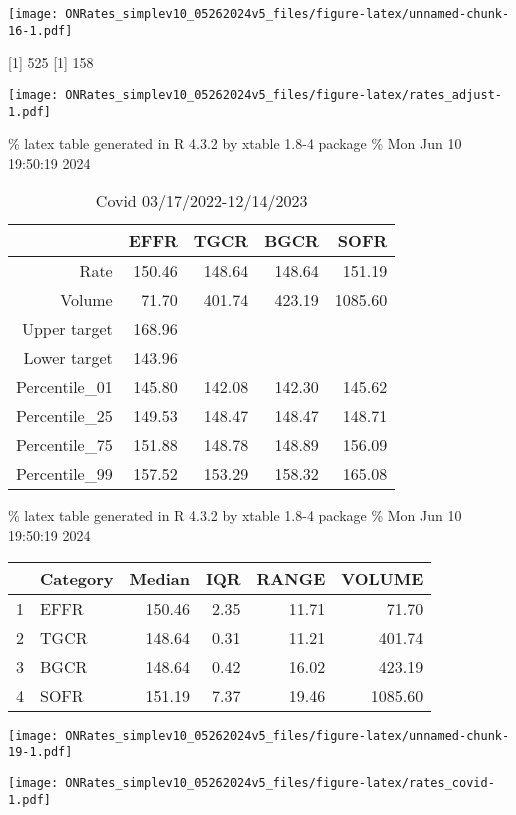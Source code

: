 \documentclass[
]{article}
\begin{document}
\texttt{[image: ONRates\_simplev10\_05262024v5\_files/figure-latex/unnamed-chunk-16-1.pdf]}

{[}1{]} 525
{[}1{]} 158

\texttt{[image: ONRates\_simplev10\_05262024v5\_files/figure-latex/rates\_adjust-1.pdf]}

\% latex table generated in R 4.3.2 by xtable 1.8-4 package
\% Mon Jun 10 19:50:19 2024

\begin{table}[ht]
\centering
\begin{tabular}{rrrrr}
  \hline
 & EFFR & TGCR & BGCR & SOFR \\ 
  \hline
Rate & 150.46 & 148.64 & 148.64 & 151.19 \\ 
  Volume & 71.70 & 401.74 & 423.19 & 1085.60 \\ 
  Upper target & 168.96 &  &  &  \\ 
  Lower target & 143.96 &  &  &  \\ 
  Percentile\_01 & 145.80 & 142.08 & 142.30 & 145.62 \\ 
  Percentile\_25 & 149.53 & 148.47 & 148.47 & 148.71 \\ 
  Percentile\_75 & 151.88 & 148.78 & 148.89 & 156.09 \\ 
  Percentile\_99 & 157.52 & 153.29 & 158.32 & 165.08 \\ 
   \hline
\end{tabular}
\caption{Covid 03/17/2022-12/14/2023} 
\end{table}

\% latex table generated in R 4.3.2 by xtable 1.8-4 package
\% Mon Jun 10 19:50:19 2024

\begin{table}[ht]
\centering
\begin{tabular}{rlrrrr}
  \hline
 & Category & Median & IQR & RANGE & VOLUME \\ 
  \hline
1 & EFFR & 150.46 & 2.35 & 11.71 & 71.70 \\ 
  2 & TGCR & 148.64 & 0.31 & 11.21 & 401.74 \\ 
  3 & BGCR & 148.64 & 0.42 & 16.02 & 423.19 \\ 
  4 & SOFR & 151.19 & 7.37 & 19.46 & 1085.60 \\ 
   \hline
\end{tabular}
\end{table}

\texttt{[image: ONRates\_simplev10\_05262024v5\_files/figure-latex/unnamed-chunk-19-1.pdf]}

\texttt{[image: ONRates\_simplev10\_05262024v5\_files/figure-latex/rates\_covid-1.pdf]}
\end{document}
